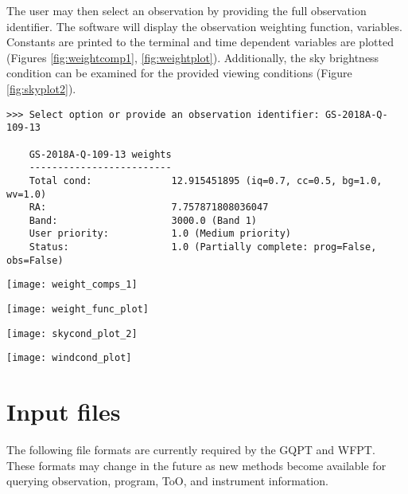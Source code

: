 \documentclass{article}
\begin{document}
The user may then select an observation by providing the full observation identifier. The software will display the observation weighting function, variables.  Constants are printed to the terminal and time dependent variables are plotted (Figures \ref{fig:weightcomp1}, \ref{fig:weightplot}).  Additionally, the sky brightness condition can be examined for the provided viewing conditions (Figure \ref{fig:skyplot2}).

\begin{lstlisting}
>>> Select option or provide an observation identifier: GS-2018A-Q-109-13

	GS-2018A-Q-109-13 weights
	-------------------------
	Total cond:              12.915451895 (iq=0.7, cc=0.5, bg=1.0, wv=1.0)
	RA:                      7.757871808036047
	Band:                    3000.0 (Band 1)
	User priority:           1.0 (Medium priority)
	Status:                  1.0 (Partially complete: prog=False, obs=False)
\end{lstlisting}

{\centering
 \texttt{[image: weight\_comps\_1]}\\
 \label{fig:weightcomp1}
}
\vspace{4mm}

{\centering
 \texttt{[image: weight\_func\_plot]}\\
 \label{fig:weightplot}
}
\vspace{4mm}

{\centering
 \texttt{[image: skycond\_plot\_2]}\\
 \label{fig:skyplot2}
}
\vspace{4mm}

{\centering
 \texttt{[image: windcond\_plot]}\\
 \label{fig:windplot2}
}
\vspace{4mm}

\section{Input files}
\label{sec:fileformats}
The following file formats are currently required by the GQPT and WFPT.  These formats may change in the future as new methods become available for querying observation, program, ToO, and instrument information.
\end{document}
